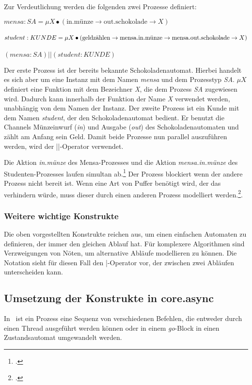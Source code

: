 Zur Verdeutlichung werden die folgenden zwei Prozesse definiert:

\begin{addmargin}[1cm]{0cm}
$mensa:SA = \mu X \bullet (\text{in.münze} \rightarrow \text{out.schokolade} \rightarrow X)$\\\\
$student:KUNDE = \mu X \bullet (\text{geldzählen} \rightarrow \text{mensa.in.münze} \rightarrow \\ \text{mensa.out.schokolade} \rightarrow  X)$\\\\
$ (mensa:SA) || (student:KUNDE) $
\end{addmargin}

Der erste Prozess ist der bereits bekannte Schokoladenautomat. Hierbei handelt es sich aber um eine Instanz mit dem Namen \textit{mensa} und dem Prozesstyp \textit{SA}. $\mu X$ definiert eine Funktion mit dem Bezeichner \textit{X}, die dem Prozess \textit{SA} zugewiesen wird. Dadurch kann innerhalb der Funktion der Name \textit{X} verwendet werden, unabhängig von dem Namen der Instanz.
Der zweite Prozess ist ein Kunde mit dem Namen \textit{student}, der den Schokoladenautomat bedient. Er benutzt die Channels Münzeinwurf (\textit{in}) und Ausgabe (\textit{out}) des Schokoladenautomaten und zählt am Anfang sein Geld. Damit beide Prozesse nun parallel auszuführen werden, wird der ||-Operator verwendet.

Die Aktion \textit{in.münze} des Mensa-Prozesses und die Aktion \textit{mensa.in.münze} des Studenten-Prozesses laufen simultan ab.\footcite[vgl][Seite 117]{CSPBOOK} Der Prozess blockiert wenn der andere Prozess nicht bereit ist. Wenn eine Art von Puffer benötigt wird, der das verhindern würde, muss dieser durch einen anderen Prozess modelliert werden.\footcite[vgl.][Seite 133]{CSPBOOK}.

\subsubsection{Weitere wichtige Konstrukte}
Die oben vorgestellten Konstrukte reichen aus, um einen einfachen Automaten zu definieren, der immer den gleichen Ablauf hat. Für komplexere Algorithmen sind Verzweigungen von Nöten, um alternative Abläufe modellieren zu können. Die Notation sieht für diesen Fall den |-Operator vor, der zwischen zwei Abläufen unterscheiden kann.

\subsection{Umsetzung der Konstrukte in core.async}
In \CA\ ist ein Prozess eine Sequenz von verschiedenen Befehlen, die entweder durch einen Thread ausgeführt werden können oder in einem \textit{go}-Block in einen Zustandsautomat umgewandelt werden.


